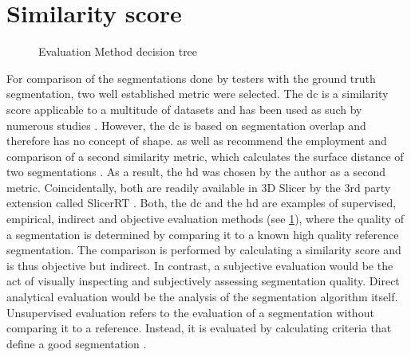 \section{Similarity score}\label{s:similarity-score}
\begin{figure}[h!]
	
	\caption{Evaluation Method decision tree \cite{wangImageSegmentationEvaluation2020}}\label{fig:eval}
\end{figure}
\noindent
For comparison of the segmentations done by testers with the ground truth segmentation, two well established metric were selected.
The \acrfull{dc} is a similarity score applicable to a multitude of datasets and has been used as such by numerous studies \cite{setiawanImageSegmentationMetrics2020,atasPerformanceEvaluationJaccardDice2023}.
However, the \acrshort{dc} is based on segmentation overlap and therefore has no concept of shape.
 as well as
\citeauthor{wangImageSegmentationEvaluation2020} recommend the employment and comparison of a second similarity metric, which calculates the surface distance of two segmentations \cite{aspertMESHMeasuringErrors2002,simBrainVentricleDetection2016}.
As a result, the \acrfull{hd} was chosen by the author as a second metric.
Coincidentally, both are readily available in 3D Slicer by the 3rd party extension called SlicerRT \cite{pinterSlicerRTRadiationTherapy2012}.
Both, the \acrlong{dc} and the \acrlong{hd} are examples of supervised, empirical, indirect and objective evaluation methods (see \cref{fig:eval}),
where the quality of a segmentation is determined by comparing it to a known high quality reference segmentation.
The comparison is performed by calculating a similarity score and is thus objective but indirect.
In contrast, a subjective evaluation would be the act of visually inspecting and subjectively assessing segmentation quality.
Direct analytical evaluation would be the analysis of the segmentation algorithm itself.
Unsupervised evaluation refers to the evaluation of a segmentation without comparing it to a reference.
Instead, it is evaluated by calculating criteria that define a good segmentation \cite{wangImageSegmentationEvaluation2020}.


